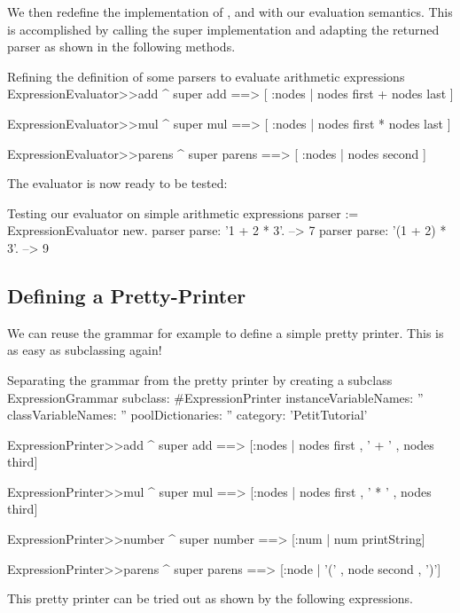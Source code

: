 \documentclass[a4paper,10pt,twoside]{book}
\begin{document}
We then redefine the implementation of ,  and
 with our evaluation semantics. This is accomplished by
calling the super implementation and adapting the returned parser as shown in the following methods.

\begin{script}{Refining the definition of some parsers to evaluate arithmetic expressions}
ExpressionEvaluator>>add
   ^ super add ==> [ :nodes | nodes first + nodes last ]

ExpressionEvaluator>>mul
   ^ super mul ==> [ :nodes | nodes first * nodes last ]

ExpressionEvaluator>>parens
   ^ super parens ==> [ :nodes | nodes second ]
\end{script}

The evaluator is now ready to be tested:

\begin{script}{Testing our evaluator on simple arithmetic expressions}
parser := ExpressionEvaluator new.
parser parse: '1 + 2 * 3'.       --> 7
parser parse: '(1 + 2) * 3'.     --> 9
\end{script}

\subsection{Defining a Pretty-Printer}

We can reuse the grammar for example to define a simple pretty printer.
This is as easy as subclassing  again!

\begin{script}{Separating the grammar from the pretty printer by creating a subclass}
ExpressionGrammar subclass: #ExpressionPrinter
  instanceVariableNames: ''
  classVariableNames: ''
  poolDictionaries: ''
  category: 'PetitTutorial'

ExpressionPrinter>>add
  ^ super add ==> [:nodes | nodes first , ' + ' , nodes third]

ExpressionPrinter>>mul
  ^ super mul ==> [:nodes | nodes first , ' * ' , nodes third]

ExpressionPrinter>>number
  ^ super number ==> [:num | num printString]

ExpressionPrinter>>parens
  ^ super parens ==> [:node | '(' , node second , ')']
\end{script}

This pretty printer can be tried out as shown by the following expressions.
\end{document}
